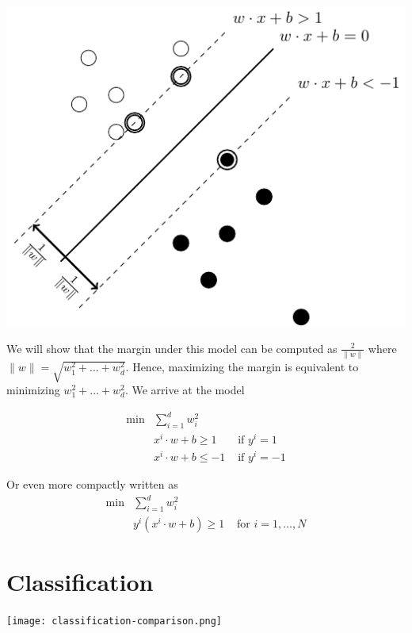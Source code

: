 \documentclass[../open-optimization/open-optimization.tex]{subfiles}
\begin{document}
\begin{center}
\includegraphics[scale = 0.75]{svm2}
\end{center}
We will show that the margin under this model can be computed as $\frac{2}{\|w\|}$ where $\|w\| = \sqrt{w_1^2 +  \dots + w_d^2}$.  Hence,  maximizing the margin is equivalent to minimizing $w_1^2 +  \dots + w_d^2$.  We arrive at the model

\begin{align}
\min & \sum_{i=1}^d w_i^2\\
&x^i \cdot w + b  \geq 1  & \text{ if } y^i = 1\\
&x^i \cdot w + b  \leq -1  & \text{ if } y^i = -1
\end{align}

Or even more compactly written as 
\begin{align}
\min & \sum_{i=1}^d w_i^2\\
&y^i(x^i \cdot w + b) \geq 1  & \text{ for } i=1, \dots, N
\end{align}






\section{Classification}

\texttt{[image: classification-comparison.png]}\footnotemark
{}
\end{document}
